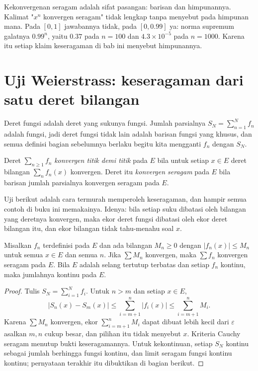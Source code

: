 \begin{catatan}
Kekonvergenan seragam adalah sifat pasangan: barisan dan himpunannya. Kalimat
"$x^n$ konvergen seragam" tidak lengkap tanpa menyebut pada himpunan mana. Pada
$[0,1]$ jawabannya tidak, pada $[0,0.99]$ ya: norma supremum galatnya
$0.99^n$, yaitu $0.37$ pada $n=100$ dan $4.3\times10^{-5}$ pada $n=1000$.
Karena itu setiap klaim keseragaman di bab ini menyebut himpunannya.
\end{catatan}

\section{Uji Weierstrass: keseragaman dari satu deret bilangan}

Deret fungsi adalah deret yang sukunya fungsi. Jumlah parsialnya
$S_N=\sum_{n=1}^{N}f_n$ adalah fungsi, jadi deret fungsi tidak lain adalah
barisan fungsi yang khusus, dan semua definisi bagian sebelumnya berlaku begitu
kita mengganti $f_n$ dengan $S_N$.

\begin{definisi}
Deret $\sum_{n\ge1}f_n$ \emph{konvergen titik demi titik} pada $E$ bila untuk
setiap $x\in E$ deret bilangan $\sum_n f_n(x)$ konvergen. Deret itu
\emph{konvergen seragam} pada $E$ bila barisan jumlah
parsialnya konvergen seragam pada $E$.
\end{definisi}

Uji berikut adalah cara termurah memperoleh keseragaman, dan hampir semua
contoh di buku ini memakainya. Idenya: bila setiap suku dibatasi oleh bilangan
yang deretnya konvergen, maka ekor deret fungsi dibatasi oleh ekor deret
bilangan itu, dan ekor bilangan tidak tahu-menahu soal $x$.

\begin{teorema}
Misalkan $f_n$ terdefinisi pada $E$ dan ada bilangan $M_n\ge0$ dengan
$|f_n(x)|\le M_n$ untuk semua $x\in E$ dan semua $n$. Jika $\sum M_n$
konvergen, maka $\sum f_n$ konvergen seragam pada $E$. Bila $E$ adalah selang
tertutup terbatas dan setiap $f_n$ kontinu, maka jumlahnya kontinu pada $E$.
\end{teorema}

\begin{proof}
Tulis $S_N=\sum_{i=1}^{N}f_i$. Untuk $n>m$ dan setiap $x\in E$,
\[
  |S_n(x)-S_m(x)|\le\sum_{i=m+1}^{n}|f_i(x)|\le\sum_{i=m+1}^{n}M_i .
\]
Karena $\sum M_n$ konvergen, ekor $\sum_{i=m+1}^{n}M_i$ dapat dibuat lebih
kecil dari $\varepsilon$ asalkan $m,n$ cukup besar, dan pilihan itu tidak
menyebut $x$. Kriteria Cauchy seragam menutup bukti keseragamannya. Untuk
kekontinuan, setiap $S_N$ kontinu sebagai jumlah berhingga fungsi kontinu, dan
limit seragam fungsi kontinu kontinu; pernyataan terakhir itu dibuktikan di
bagian berikut.
\end{proof}

